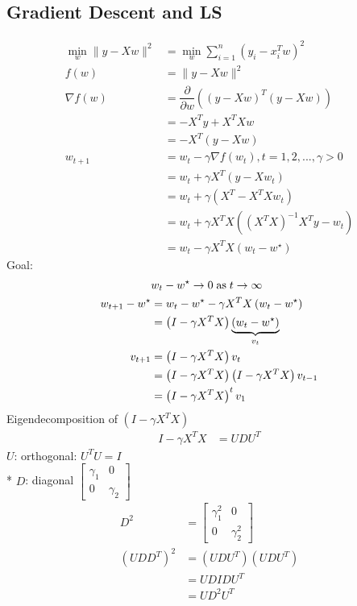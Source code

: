 \documentclass{article}
\begin{document}
\subsection{Gradient Descent and LS}
\begin{align*}
\displaystyle\min_{w} \| y - X w \|^{2} &= \displaystyle\min_{w} \displaystyle\sum_{i=1}^{n} \left(y_{i} - x_{i}^{T} w\right)^{2}
\\ f\left(w\right)  &= \| y - X w \|^{2}
\\ \nabla  f\left(w\right) &= \dfrac{\partial }{\partial w} \left(\left(y - X w\right)^{T} \left(y - X w\right)\right)
\\ &= - X^{T} y + X^{T} X w 
\\ &= - X^{T} \left( y - X w \right)
\\ w_{t+1} &= w_{t} - \gamma \nabla  f\left(w_{t}\right), t = 1, 2, ..., \gamma > 0
\\ &= w_{t} + \gamma X^{T} \left(y - X w_{t}\right)
\\ &= w_{t} + \gamma \left(X^{T} - X^{T} X w_{t}\right)
\\ &= w_{t} + \gamma X^{T} X\left(\left(X^{T} X\right)^{-1} X^{T} y - w_{t}\right)
\\ &= w_{t} - \gamma X^{T} X \left(w_{t} - w^\star \right)
\end{align*}
Goal:
\begin{align*}
&  w_{t} - w^\star  \to  0 \text{\;as\;} t \to  \infty
\\ w_{t+1} - w^\star  &= w_{t} - w^\star  - \gamma X^{T} X \left(w_{t} - w^\star \right)
\\ &= \left(I - \gamma X^{T} X\right)\underbrace{\left(w_{t} - w^\star \right)}_{v_{t}}
\\ v_{t+1} &= \left(I - \gamma X^{T} X\right) v_{t}
\\ &= \left(I - \gamma X^{T} X\right) \left(I - \gamma X^{T} X\right) v_{t-1}
\\ &= \left(I - \gamma X^{T} X\right)^{t} v_{1}
\end{align*}
Eigendecomposition of $\left(I  - \gamma X^{T} X\right)$
\begin{align*}
I  - \gamma X^{T} X &= U D U^{T}
\end{align*}
$U $: orthogonal: $U^{T} U = I $
\\* $D $: diagonal $\begin{bmatrix} \gamma_{1} & 0 \\ 0 & \gamma_{2} \end{bmatrix}$
\begin{align*}
D^{2} &= \begin{bmatrix} \gamma_{1}^{2} & 0 \\ 0 & \gamma_{2}^{2} \end{bmatrix}
\\ \left(U  D D^{T}\right)^{2} &= \left(U D U^{T}\right) \left(U D U^{T}\right)
\\ &= U D I D U^{T}
\\ &= U D^{2} U^{T}
\end{align*}
\end{document}
